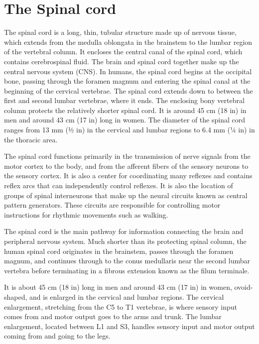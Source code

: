 \hypertarget{the-spinal-cord}{%
\section{The Spinal cord}\label{the-spinal-cord}}

The spinal cord is a long, thin, tubular structure made up of nervous tissue, which extends from the medulla oblongata in the brainstem to the lumbar region of the vertebral column. It encloses the central canal of the spinal cord, which contains cerebrospinal fluid. The brain and spinal cord together make up the central nervous system (CNS). In humans, the spinal cord begins at the occipital bone, passing through the foramen magnum and entering the spinal canal at the beginning of the cervical vertebrae. The spinal cord extends down to between the first and second lumbar vertebrae, where it ends. The enclosing bony vertebral column protects the relatively shorter spinal cord. It is around 45 cm (18 in) in men and around 43 cm (17 in) long in women. The diameter of the spinal cord ranges from 13 mm (1⁄2 in) in the cervical and lumbar regions to 6.4 mm (1⁄4 in) in the thoracic area.

The spinal cord functions primarily in the transmission of nerve signals from the motor cortex to the body, and from the afferent fibers of the sensory neurons to the sensory cortex. It is also a center for coordinating many reflexes and contains reflex arcs that can independently control reflexes. It is also the location of groups of spinal interneurons that make up the neural circuits known as central pattern generators. These circuits are responsible for controlling motor instructions for rhythmic movements such as walking.

The spinal cord is the main pathway for information connecting the brain and peripheral nervous system. Much shorter than its protecting spinal column, the human spinal cord originates in the brainstem, passes through the foramen magnum, and continues through to the conus medullaris near the second lumbar vertebra before terminating in a fibrous extension known as the filum terminale.

It is about 45 cm (18 in) long in men and around 43 cm (17 in) in women, ovoid-shaped, and is enlarged in the cervical and lumbar regions. The cervical enlargement, stretching from the C5 to T1 vertebrae, is where sensory input comes from and motor output goes to the arms and trunk. The lumbar enlargement, located between L1 and S3, handles sensory input and motor output coming from and going to the legs.

